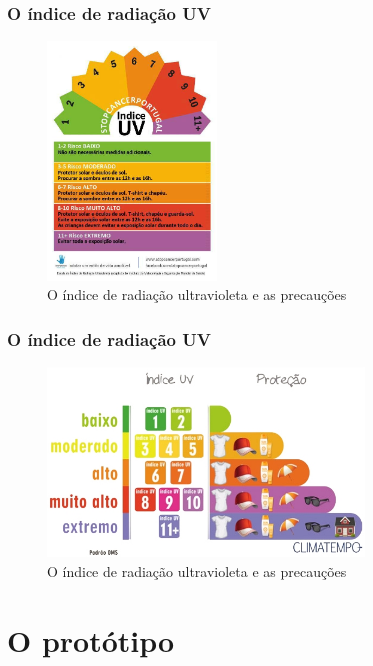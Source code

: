 \documentclass{beamer}
\begin{document}
			
		\begin{frame}
			\frametitle{O índice de radiação UV} 
				\begin{figure}[htb]
					\includegraphics[width=0.40\textwidth]{img/Tabela-UV.jpg}
					\caption{O índice de radiação ultravioleta e as precauções}
				\end{figure}
			\end{frame}
			
			\begin{frame}
			\frametitle{O índice de radiação UV} 
				\begin{figure}[htb]
					\includegraphics[width=0.75\textwidth]{img/Tabela-UV-2.jpg}
					\caption{O índice de radiação ultravioleta e as precauções}
				\end{figure}
			\end{frame}
	
	\section{O protótipo}
	
\end{document}
